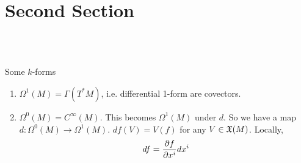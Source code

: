 \documentclass[10pt]{article}
\begin{document}
\section*{Second Section} 
\\\\
\begin{example}
    Some $k$-forms
    \begin{enumerate}
        \item $\Omega^1(M) = \Gamma(T^*M)$, i.e. differential 1-form are covectors.
        \item $\Omega^0(M) = C^\infty(M)$. This becomes $\Omega^1(M)$ under $d$. So we have a map $d: \Omega^0(M) \to \Omega^1(M)$. $df(V) = V(f)$ for any $V\in \mathfrak{X}(M)$. Locally, 
        $$df = \frac{\partial f}{\partial x^i}dx^i$$
    \end{enumerate}
\end{example}
\end{document}
